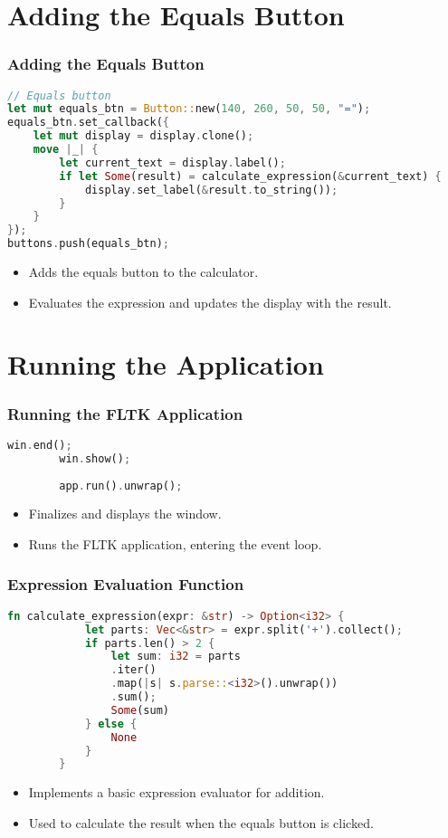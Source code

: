 \documentclass[aspectratio=169, table]{beamer}
\begin{document}
\section{Adding the Equals Button}
\begin{frame}[fragile]
\frametitle{Adding the Equals Button}
\vspace{15pt}
\begin{lstlisting}[language=Rust]
// Equals button
let mut equals_btn = Button::new(140, 260, 50, 50, "=");
equals_btn.set_callback({
	let mut display = display.clone();
	move |_| {
		let current_text = display.label();
		if let Some(result) = calculate_expression(&current_text) {
			display.set_label(&result.to_string());
		}
	}
});
buttons.push(equals_btn);
\end{lstlisting}
\begin{itemize}
\item Adds the equals button to the calculator.
\item Evaluates the expression and updates the display with the result.
\end{itemize}
\end{frame}

\section{Running the Application}

\begin{frame}[fragile]
	\frametitle{Running the FLTK Application}
	\begin{lstlisting}[language=Rust]
		win.end();
		win.show();
		
		app.run().unwrap();
	\end{lstlisting}
	\begin{itemize}
		\item Finalizes and displays the window.
		\item Runs the FLTK application, entering the event loop.
	\end{itemize}
\end{frame}

\begin{frame}[fragile]
	\frametitle{Expression Evaluation Function}
	\vspace{15pt}
	\begin{lstlisting}[language=Rust]
		fn calculate_expression(expr: &str) -> Option<i32> {
			let parts: Vec<&str> = expr.split('+').collect();
			if parts.len() > 2 {
				let sum: i32 = parts
				.iter()
				.map(|s| s.parse::<i32>().unwrap())
				.sum();
				Some(sum)
			} else {
				None
			}
		}
	\end{lstlisting}
	\begin{itemize}
		\item Implements a basic expression evaluator for addition.
		\item Used to calculate the result when the equals button is clicked.
	\end{itemize}
\end{frame}
\end{document}
